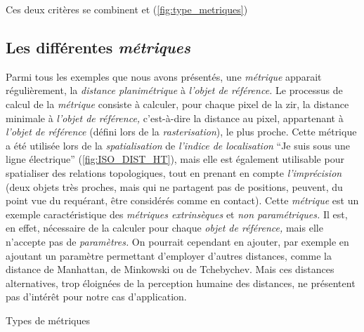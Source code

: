 Ces deux critères se combinent et (\autoref{fig:type_metriques})

\subsection{Les différentes \emph{métriques}}

Parmi tous les exemples que nous avons présentés, une \emph{métrique}
apparait régulièrement, la \emph{distance planimétrique} à
\emph{l'objet de référence.} Le processus de calcul de la
\emph{métrique} consiste à calculer, pour chaque pixel de la \ac{zir},
la distance minimale à \emph{l'objet de référence,} c'est-à-dire la
distance au pixel, appartenant à \emph{l'objet de référence} (défini
lors de la \emph{rasterisation}), le plus proche. Cette métrique a été
utilisée lors de la \emph{spatialisation} de \emph{l'indice de
  localisation} \enquote{Je suis sous une ligne électrique}
(\autoref{fig:ISO_DIST_HT}), mais elle est également utilisable pour
spatialiser des relations topologiques, tout en prenant en compte
\emph{l'imprécision} (\eg deux objets très proches, mais qui ne
partagent pas de positions, peuvent, du point vue du requérant, être
considérés comme en contact). Cette \emph{métrique} est un exemple
caractéristique des \emph{métriques extrinsèques} et \emph{non
  paramétriques.} Il est, en effet, nécessaire de la calculer pour
chaque \emph{objet de référence,} mais elle n'accepte pas de
\emph{paramètres.}  On pourrait cependant en ajouter, par exemple en
ajoutant un paramètre permettant d'employer d'autres distances, comme
la distance de Manhattan, de Minkowski ou de Tchebychev. Mais ces
distances alternatives, trop éloignées de la perception humaine des
distances, ne présentent pas d’intérêt pour notre cas d'application.

\begin{table}
  \centering
  
  \caption{Types de métriques}
  \label{fig:type_metriques}
\end{table}

